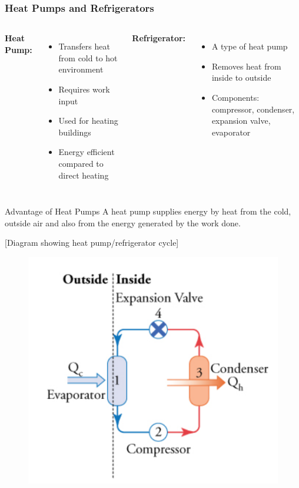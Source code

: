 \documentclass{beamer}
\begin{document}
\begin{frame}
    \frametitle{Heat Pumps and Refrigerators}
    \begin{columns}
        \textbf{Heat Pump:}
        \begin{itemize}
            \item Transfers heat from cold to hot environment
            \item Requires work input
            \item Used for heating buildings
            \item Energy efficient compared to direct heating
        \end{itemize}
        
        \textbf{Refrigerator:}
        \begin{itemize}
            \item A type of heat pump
            \item Removes heat from inside to outside
            \item Components: compressor, condenser, expansion valve, evaporator
        \end{itemize}
    \end{columns}
    
    \begin{block}{Advantage of Heat Pumps}
        A heat pump supplies energy by heat from the cold, outside air and also from the energy generated by the work done.
    \end{block}
    
    \begin{center}
        \alert{[Diagram showing heat pump/refrigerator cycle]}
    \end{center}
\end{frame}


\begin{frame}
\begin{figure}
    \centering
    \includegraphics[width=0.75\linewidth]{phys11-thermo-heat-pump-refrigerator-cycle.png}
\end{figure}
\end{frame}
\end{document}
